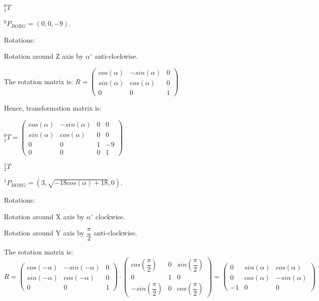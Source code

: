 \documentclass[12pt]{article}
\begin{document}
\begin{list}{)~}{}
\item
$_{1}^{0}T$

$^0 P_{BORG} = \left(0, 0, -9\right)$.

Rotations:

\begin{list}{)~}{}
\item
Rotation around Z axis by $\alpha^\circ$ anti-clockwise.
\end{list}

The rotation matrix is:
$R=\left(\begin{array}{ccc}
cos\left(\alpha\right) & -sin\left(\alpha\right) & 0 \\
sin\left(\alpha\right) & cos\left(\alpha\right) & 0\\
0 & 0 & 1\end{array}\right)$

Hence, transformation matrix is:

$_{1}^{0}T = \left(\begin{array}{cccc}
cos\left(\alpha\right) & - sin\left(\alpha\right) & 0 & 0 \\
sin\left(\alpha\right) & cos\left(\alpha\right) & 0 & 0\\
0 & 0 & 1 & -9\\
0 & 0 & 0 & 1\end{array}\right)$

\item
$_{2}^{1}T$

$^1 P_{BORG} = \left(3, \sqrt{- 18 cos(\alpha) + 18}, 0\right)$.

Rotations:

\begin{list}{)~}{}
\item Rotation around X axis by $\alpha^\circ$ clockwise.
\item Rotation around Y axis by $\dfrac{\pi}{2}$ anti-clockwise.
\end{list}

The rotation matrix is:
$R=\left(\begin{array}{ccc}
cos\left(-\alpha\right) & -sin\left(-\alpha\right) & 0 \\
sin\left(-\alpha\right) & cos\left(-\alpha\right) & 0\\
0 & 0 & 1\end{array}\right)\cdot
\left(\begin{array}{ccc}
cos \left(\dfrac{\pi}{2}\right) & 0 & sin \left(\dfrac{\pi}{2}\right) \\
0 & 1 & 0\\
-sin \left(\dfrac{\pi}{2}\right) & 0 & cos \left(\dfrac{\pi}{2}\right) \end{array}\right) =\left(\begin{array}{ccc}
0 & sin\left(\alpha\right) & cos\left(\alpha\right) \\
0 & cos\left(\alpha\right) & -sin\left(\alpha\right)\\
-1 & 0 & 0\end{array}\right)$


\end{list}
\end{document}
